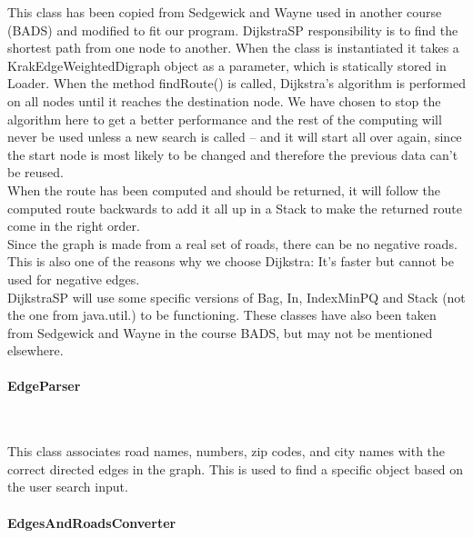 \documentclass[a4paper,10pt,titlepage]{article}
\begin{document}
This class has been copied from Sedgewick and Wayne \cite{sedgewickAndWayneDijkstraSP} used in another course (BADS) and modified to fit our program. DijkstraSP responsibility is to find the shortest path from one node to another. When the class is instantiated it takes a KrakEdgeWeightedDigraph object as a parameter, which is statically stored in Loader. When the method findRoute() is called, Dijkstra’s algorithm is performed on all nodes until it reaches the destination node. We have chosen to stop the algorithm here to get a better performance and the rest of the computing will never be used unless a new search is called – and it will start all over again, since the start node is most likely to be changed and therefore the previous data can’t be reused.\\
When the route has been computed and should be returned, it will follow the computed route backwards to add it all up in a Stack to make the returned route come in the right order.\\
Since the graph is made from a real set of roads, there can be no negative roads. This is also one of the reasons why we choose Dijkstra: It’s faster but cannot be used for negative edges. \\
DijkstraSP will use some specific versions of Bag\cite{sedgewickAndWayneBag}, In\cite{sedgewickAndWayneIn}, IndexMinPQ\cite{sedgewickAndWayneIndexMinPQ} and Stack\cite{sedgewickAndWayneStack} (not the one from java.util.) to be functioning. These classes have also been taken from Sedgewick and Wayne in the course BADS, but may not be mentioned elsewhere. \\
 
				
				\paragraph{EdgeParser}\mbox{}\
				
This class associates road names, numbers, zip codes, and city names with the correct directed edges in the graph. This is used to find a specific object based on the user search input.
				
				\paragraph{EdgesAndRoadsConverter}\mbox{}\
				
\end{document}
